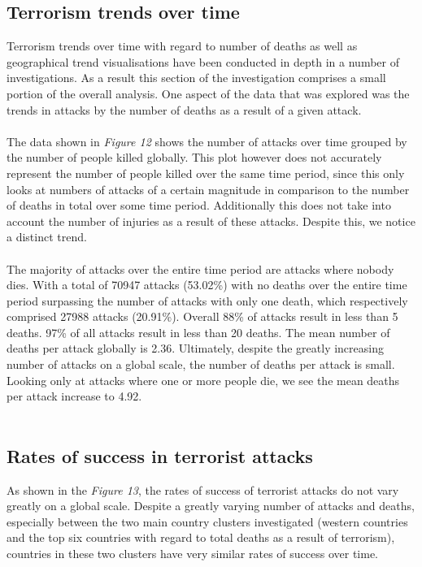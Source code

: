\documentclass[10pt,a4paper]{article}
\begin{document}
\subsection{Terrorism trends over time}

Terrorism trends over time with regard to number of deaths as well as geographical trend visualisations have been conducted in depth in a number of investigations. 
As a result this section of the investigation comprises a small portion of the overall analysis. 
One aspect of the data that was explored was the trends in attacks by the number of deaths as a result of a given attack.
\\\\
The data shown in \textit{Figure 12} shows the number of attacks over time grouped by the number of people killed globally. 
This plot however does not accurately represent the number of people killed over the same time period, since this only looks at numbers of attacks of a certain magnitude in comparison to the number of deaths in total over some time period.
Additionally this does not take into account the number of injuries as a result of these attacks. 
Despite this, we notice a distinct trend. 
\\\\
The majority of attacks over the entire time period are attacks where nobody dies. 
With a total of 70947 attacks (53.02\%) with no deaths over the entire time period surpassing the number of attacks with only one death, which respectively comprised 27988 attacks (20.91\%).
Overall 88\% of attacks result in less than 5 deaths. 
97\% of all attacks result in less than 20 deaths.
The mean number of deaths per attack globally is 2.36. 
Ultimately, despite the greatly increasing number of attacks on a global scale, the number of deaths per attack is small. 
Looking only at attacks where one or more people die, we see the mean deaths per attack  increase to 4.92.
\\\\

\subsection{Rates of success in terrorist attacks}
As shown in the \textit{Figure 13}, the rates of success of terrorist attacks do not vary greatly on a global scale. Despite a greatly varying number of attacks and deaths, especially between the two main country clusters investigated (western countries and the top six countries with regard to total deaths as a result of terrorism), countries in these two clusters have very similar rates of success over time. 
\end{document}
